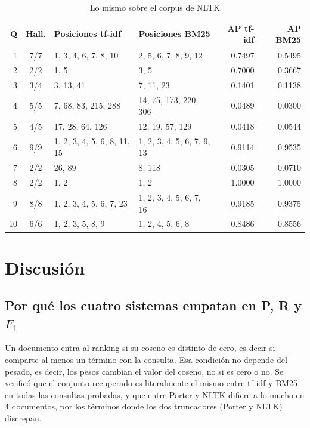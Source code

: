 \documentclass[11pt,letterpaper]{article}
\begin{document}
\begin{table}[H]
  \centering
  \begin{tabular}{rcllrr}
    \toprule
    \textbf{Q} & \textbf{Hall.} & \textbf{Posiciones tf-idf}
      & \textbf{Posiciones BM25} & \textbf{AP tf-idf}
      & \textbf{AP BM25} \\
    \midrule
     1 & 7/7 & 1, 3, 4, 6, 7, 8, 10   & 2, 5, 6, 7, 8, 9, 12
       & 0.7497 & 0.5495 \\
     2 & 2/2 & 1, 5                   & 3, 5
       & 0.7000 & 0.3667 \\
     3 & 3/4 & 3, 13, 41              & 7, 11, 23
       & 0.1401 & 0.1138 \\
     4 & 5/5 & 7, 68, 83, 215, 288    & 14, 75, 173, 220, 306
       & 0.0489 & 0.0300 \\
     5 & 4/5 & 17, 28, 64, 126        & 12, 19, 57, 129
       & 0.0418 & 0.0544 \\
     6 & 9/9 & 1, 2, 3, 4, 5, 6, 8, 11, 15
             & 1, 2, 3, 4, 5, 6, 7, 9, 13
       & 0.9114 & 0.9535 \\
     7 & 2/2 & 26, 89                 & 8, 118
       & 0.0305 & 0.0710 \\
     8 & 2/2 & 1, 2                   & 1, 2
       & 1.0000 & 1.0000 \\
     9 & 8/8 & 1, 2, 3, 4, 5, 6, 7, 23
             & 1, 2, 3, 4, 5, 6, 7, 16
       & 0.9185 & 0.9375 \\
    10 & 6/6 & 1, 2, 3, 5, 8, 9       & 1, 2, 4, 5, 6, 8
       & 0.8486 & 0.8556 \\
    \bottomrule
  \end{tabular}
  \caption{Lo mismo sobre el corpus de NLTK}
  \label{tab:posiciones-nltk}
\end{table}

\section{Discusión}

\subsection*{Por qué los cuatro sistemas empatan en P, R y $F_1$}

Un documento entra al ranking si su coseno es distinto de cero, es
decir si comparte al menos un término con la consulta. Esa condición
no depende del pesado, es decir, los pesos cambian el valor del coseno,
no si es cero o no. Se verificó que el conjunto recuperado es
literalmente el mismo entre tf-idf y BM25 en todas las consultas
probadas, y que entre Porter y NLTK difiere a lo mucho en 4 documentos,
por los términos donde los dos truncadores (Porter y NLTK) discrepan.
\end{document}
